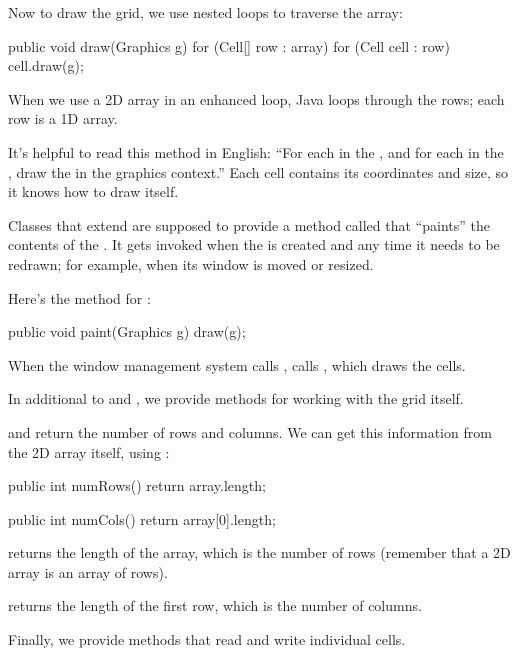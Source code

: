 Now to draw the grid, we use nested loops to traverse the array:

\begin{code}
public void draw(Graphics g) {
    for (Cell[] row : array) {
        for (Cell cell : row) {
            cell.draw(g);
        }
    }
}
\end{code}

When we use a 2D array in an enhanced  loop, Java loops through the rows; each row is a 1D array.

It's helpful to read this method in English: ``For each  in the , and for each  in the , draw the  in the graphics context.''
Each cell contains its coordinates and size, so it knows how to draw itself.

Classes that extend  are supposed to provide a method called  that ``paints'' the contents of the .
It gets invoked when the  is created and any time it needs to be redrawn; for example, when its window is moved or resized.

Here's the  method for :

\begin{code}
public void paint(Graphics g) {
    draw(g);
}
\end{code}

When the window management system calls ,  calls , which draws the cells.


In additional to  and , we provide methods for working with the grid itself.

 and  return the number of rows and columns.
We can get this information from the 2D array itself, using :

\begin{code}
public int numRows() {
    return array.length;
}

public int numCols() {
    return array[0].length;
}
\end{code}

 returns the length of the array, which is the number of rows (remember that a 2D array is an array of rows).

 returns the length of the first row, which is the number of columns.

Finally, we provide methods that read and write individual cells.

